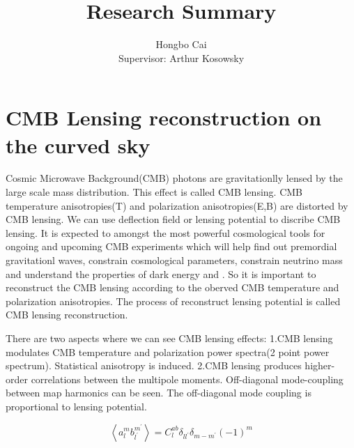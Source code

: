 \documentclass[12pt, notitlepage, onecolumn, amsmath, amssymb, aps]{revtex4-1}
\title{}
\begin{document}
\title{Research Summary}
\author{Hongbo Cai \\{\small Supervisor: Arthur Kosowsky}}
\maketitle
\newcommand{\edit}[1]{\textcolor{red}{(#1)}}
\vspace{-1.5cm}
\section{CMB Lensing reconstruction on the curved sky}
\label{sec:org8852578}


Cosmic Microwave Background(CMB) photons are gravitationlly lensed by the large scale mass distribution. This effect is called CMB lensing. CMB temperature anisotropies(T) and polarization anisotropies(E,B) are distorted by CMB lensing. We can use deflection field or lensing potential to discribe CMB lensing\cite{Lewis:2006fu}. It is expected to amongst the most powerful cosmological tools for ongoing and upcoming CMB experiments which will help find out premordial gravitationl waves, constrain cosmological parameters, constrain neutrino mass and understand the properties of dark energy and . So it is important to reconstruct the CMB lensing according to the oberved CMB temperature and polarization anisotropies. The process of reconstruct lensing potential is called CMB lensing reconstruction.

There are two aspects where we can see CMB lensing effects:
1.CMB lensing modulates CMB temperature and polarization power spectra(2 point power spectrum). Statistical anisotropy is induced.
2.CMB lensing produces higher-order correlations between the multipole moments. Off-diagonal mode-coupling between map harmonics can be seen. The off-diagonal mode coupling is proportional to lensing potential.\cite{Hu:2001kj}

\begin{equation}
  \left\langle a_{l}^{m} b_{l^{\prime}}^{m^{\prime}}\right\rangle= C_{l}^{a b} \delta_{l l^{\prime}} \delta_{m-m^{\prime}}(-1)^{m}
\end{equation}
\end{document}
